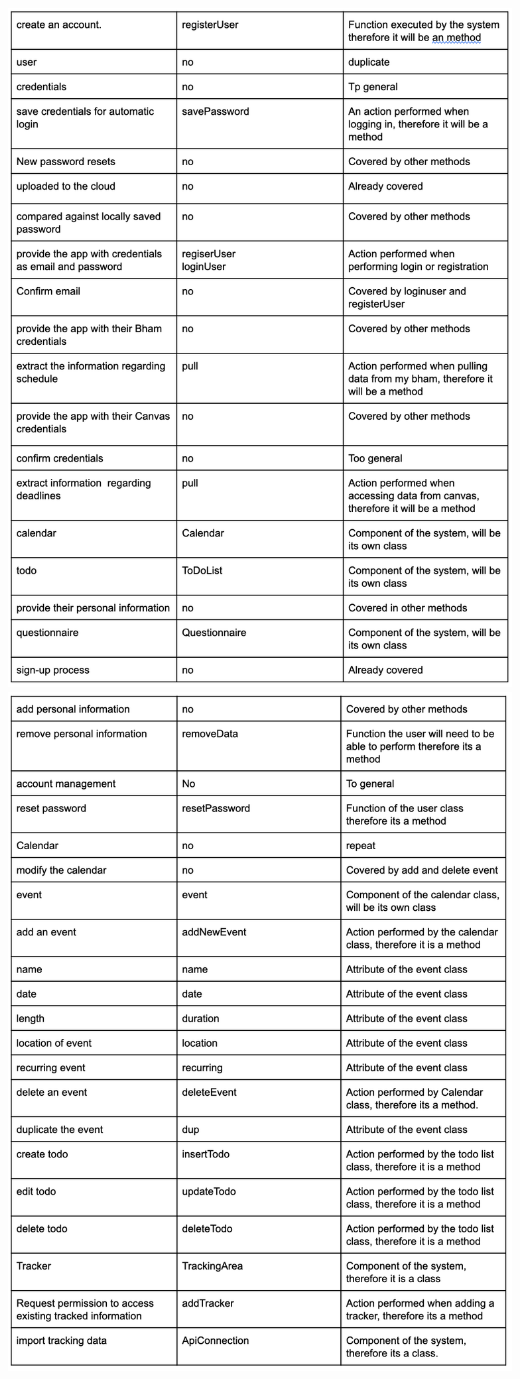 \documentclass[a4paper,11pt]{article} %
\begin{document}
\begin{center}
    \includegraphics[scale=0.9]{img/noun-verb/table2.png}
    \includegraphics[scale=0.9]{img/noun-verb/table3.png}

\end{center}
\end{document}
